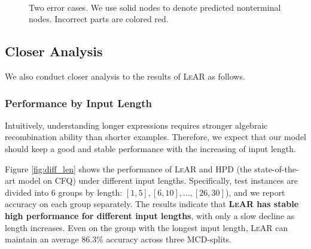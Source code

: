 \documentclass[11pt,a4paper]{article}
\begin{document}
\begin{figure}[tp]
  \centering
  
  
   \\
  
  \caption{Two error cases. We use solid nodes to denote predicted nonterminal nodes. Incorrect parts are colored red.}\label{fig:err_type} 
  
\end{figure}

\subsection{Closer Analysis}

We also conduct closer analysis to the results of \textsc{LeAR} as follows.

\subsubsection{Performance by Input Length}

Intuitively, understanding longer expressions requires stronger algebraic recombination ability than shorter examples.
Therefore, we expect that our model should keep a good and stable performance with the increasing of input length.



Figure \ref{fig:diff_len} shows the performance of \textsc{LeAR} and \textsc{HPD} (the state-of-the-art model on CFQ) under different input lengths.
Specifically, test instances are divided into 6 groups by length: $[1, 5], [6, 10], ..., [26, 30]$), and we report accuracy on each group separately.
The results indicate that \textbf{\textsc{LeAR} has stable high performance for different input lengths}, with only a slow decline as length increases.
Even on the group with the longest input length, \textsc{LeAR} can maintain an average 86.3\% accuracy across three MCD-splits.
\end{document}
